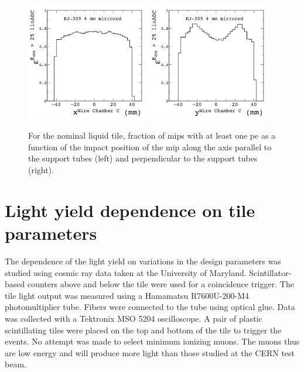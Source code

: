 \documentclass[review]{elsarticle}
\begin{document}
\begin{figure}[h]
\centering\includegraphics[width=0.48\textwidth]{./figures/fiducial2.png}
\centering\includegraphics[width=0.48\textwidth]{./figures/fiducial3.png}
\caption{For the nominal liquid tile, fraction of mips with at least
  one pe as a function of the impact position of the mip along the
  axis parallel to the support tubes (left) and perpendicular to the
  support tubes (right).
}
\label{fig:fiducial}
\end{figure}

\section{Light yield dependence on tile parameters}

The dependence of the light yield on variations in the design
parameters was studied using cosmic ray data taken at the University
of Maryland. Scintillator-based counters above and below the tile
were used for a coincidence trigger. The tile light output was measured using a
Hamamatsu R7600U-200-M4 photomultiplier tube. Fibers were connected
to the tube using optical glue. Data was collected with a Tektronix
MSO 5204 oscilloscope. A pair of plastic scintillating tiles
were placed on the top and bottom of the tile to trigger the events. 
No attempt was made to select minimum ionizing
muons. The muons thus are low energy and will produce more light than
those studied at the CERN test beam.
\end{document}
